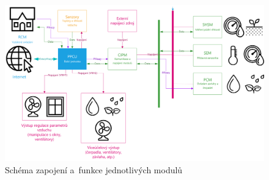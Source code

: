 \begin{figure}[htbp]
    \centering
    \includegraphics[angle=90,origin=c,scale=0.7]{img/HARDWARE/MODULES.png}
    \caption{Schéma zapojení a~funkce jednotlivých modulů}
    \label{fig:add-MODULES}
 \end{figure}

